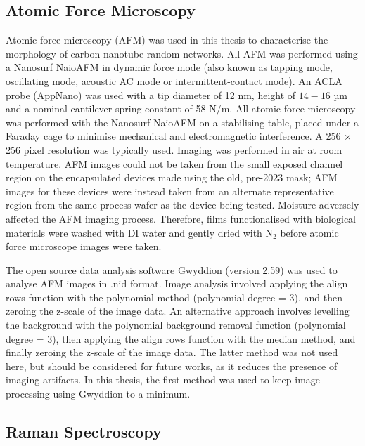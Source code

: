 \documentclass[
  a4paper,
]{scrbook}
\begin{document}
\hypertarget{sec-afm-characterisation}{%
\subsection{Atomic Force Microscopy}\label{sec-afm-characterisation}}

Atomic force microscopy (AFM) was used in this thesis to characterise
the morphology of carbon nanotube random networks. All AFM was performed
using a Nanosurf NaioAFM in dynamic force mode (also known as tapping
mode, oscillating mode, acoustic AC mode or intermittent-contact mode).
An ACLA probe (AppNano) was used with a tip diameter of 12 nm, height of
\(14-16\) µm and a nominal cantilever spring constant of 58 N/m. All
atomic force microscopy was performed with the Nanosurf NaioAFM on a
stabilising table, placed under a Faraday cage to minimise mechanical
and electromagnetic interference. A 256 \(\times\) 256 pixel resolution
was typically used. Imaging was performed in air at room temperature.
AFM images could not be taken from the small exposed channel region on
the encapsulated devices made using the old, pre-2023 mask; AFM images
for these devices were instead taken from an alternate representative
region from the same process wafer as the device being tested. Moisture
adversely affected the AFM imaging process. Therefore, films
functionalised with biological materials were washed with DI water and
gently dried with N\(_2\) before atomic force microscope images were
taken.

The open source data analysis software Gwyddion (version 2.59) was used
to analyse AFM images in .nid format. Image analysis involved applying
the align rows function with the polynomial method (polynomial degree =
3), and then zeroing the z-scale of the image data. An alternative
approach involves levelling the background with the polynomial
background removal function (polynomial degree = 3), then applying the
align rows function with the median method, and finally zeroing the
z-scale of the image data. The latter method was not used here, but
should be considered for future works, as it reduces the presence of
imaging artifacts. In this thesis, the first method was used to keep
image processing using Gwyddion to a minimum.

\hypertarget{sec-raman-characterisation}{%
\subsection{Raman Spectroscopy}\label{sec-raman-characterisation}}
\end{document}
